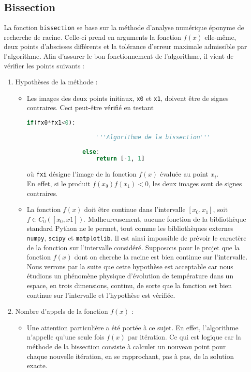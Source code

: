 \documentclass[12pt]{article}
\begin{document}
\subsection{Bissection}
    La fonction \texttt{bissection} se base sur la méthode d'analyse numérique éponyme de recherche de racine. Celle-ci prend en arguments la fonction $f(x)$ elle-même, deux points d'abscisses différents et la tolérance d'erreur maximale admissible par l'algorithme. Afin d'assurer le bon fonctionnement de l'algorithme, il vient de vérifier les points suivants :
\begin{enumerate}[label=\roman*.]
    \item Hypothèses de la méthode : 
        \begin{itemize}
            \item 
                Les images des deux points initiaux, \texttt{x0} et \texttt{x1}, doivent être de signes contraires. Ceci peut-être vérifié en testant
                \begin{lstlisting}[language=Python]
                if(fx0*fx1<0):
                    
                    '''Algorithme de la bissection'''
                    
                else:
                    return [-1, 1]
                \end{lstlisting}
                où \texttt{fxi} désigne l'image de la fonction $f(x)$ évaluée au point $x_i$. \\
                En effet, si le produit $f(x_0)f(x_1) < 0$, les deux images sont de signes contraires.
            \item
                La fonction $f(x)$ doit être continue dans l'intervalle $[x_0 , x_1]$, soit $f \in C_0([x_0,x1])$. Malheureusement, aucune fonction de la bibliothèque standard Python ne le permet, tout comme les bibliothèques externes \texttt{numpy}, \texttt{scipy} et \texttt{matplotlib}. Il est ainsi impossible de prévoir le caractère de la fonction sur l'intervalle considéré. Supposons pour le projet que la fonction $f(x)$ dont on cherche la racine est bien continue sur l'intervalle. Nous verrons par la suite que cette hypothèse est acceptable car nous étudions un phénomène physique d'évolution de température dans un espace, en trois dimensions, continu, de sorte que la fonction est bien continue sur l'intervalle et l'hypothèse est vérifiée.

        \end{itemize}
    \item 
    Nombre d'appels de la fonction $f(x)$ :
        \begin{itemize}
            \item Une attention particulière a été portée à ce sujet. En effet, l'algorithme n'appelle qu'une seule fois $f(x)$ par itération. Ce qui est logique car la méthode de la bissection consiste à calculer un nouveau point pour chaque nouvelle itération, en se rapprochant, pas à pas, de la solution exacte.
        \end{itemize}
\end{enumerate}
\end{document}
